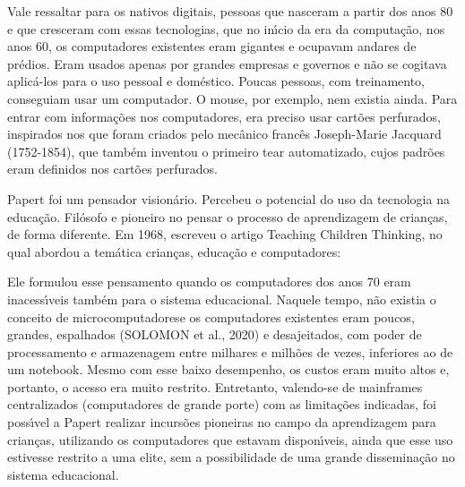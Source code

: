 \documentclass[
12pt,		%
openright,	%
twoside,  %
a4paper,			%
chapter=TITLE,		%
english,			%
french,				%
spanish,			%
brazil				%
]{USPSC-classe/USPSC}
\begin{document}
Vale ressaltar para os nativos digitais, pessoas que nasceram a partir dos anos 80 e que cresceram com essas tecnologias, que no in\'{\i}cio da era da computa\c{c}\~ao, nos anos 60, os computadores existentes eram gigantes e ocupavam andares de pr\'edios. Eram usados apenas por grandes empresas e governos e n\~ao se cogitava aplic\'a-los para o uso pessoal e dom\'estico. Poucas pessoas, com treinamento, conseguiam usar um computador. O mouse, por exemplo, nem existia ainda. Para entrar com informa\c{c}\~oes nos computadores, era preciso usar cart\~oes perfurados, inspirados nos que foram criados pelo mec\^anico franc\^es Joseph-Marie Jacquard (1752-1854), que tamb\'em inventou o primeiro tear automatizado, cujos padr\~oes eram definidos nos cart\~oes perfurados.








Papert foi um pensador vision\'ario. Percebeu o potencial do uso da tecnologia na educa\c{c}\~ao. Fil\'osofo e pioneiro no pensar o processo de aprendizagem de crian\c{c}as, de forma diferente. Em 1968, escreveu o artigo \textquotedbl Teaching Children Thinking\textquotedbl , no qual abordou a tem\'atica crian\c{c}as, educa\c{c}\~ao e computadores:









\noindent\begin{center}\mbox{\centering{}}\end{center}


Ele formulou esse pensamento quando os computadores dos anos 70 eram inacess\'{\i}veis tamb\'em para o sistema educacional. Naquele tempo, n\~ao existia o conceito de \textquotedbl microcomputadores\textquotedbl  e os computadores existentes eram poucos, grandes, espalhados  (SOLOMON et al., 2020) e desajeitados, com poder de processamento e armazenagem entre milhares e milh\~oes de vezes, inferiores ao de um notebook. Mesmo com esse baixo desempenho, os custos eram muito altos e, portanto, o acesso era muito restrito. Entretanto, valendo-se de mainframes centralizados (computadores de grande porte) com as limita\c{c}\~oes indicadas, foi poss\'{\i}vel a Papert realizar incurs\~oes pioneiras no campo da aprendizagem para crian\c{c}as, utilizando os computadores que estavam dispon\'{\i}veis, ainda que esse uso estivesse restrito a uma elite, sem a possibilidade de uma grande dissemina\c{c}\~ao no sistema educacional.
\end{document}
